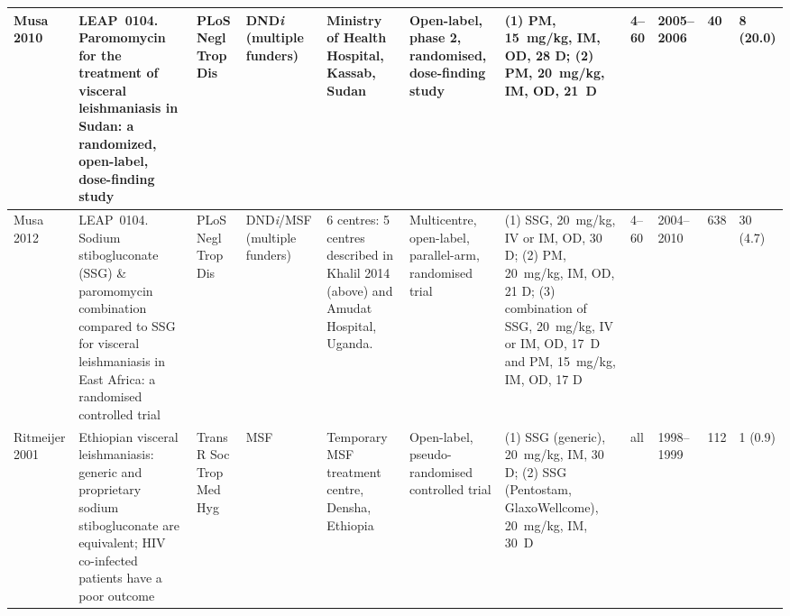 \begin{ThreePartTable}
\begin{longtable}[c]{L{1cm} L{4cm} L{1cm} L{1.5cm} L{3.5cm} L{2.5cm} L{3.7cm} L{1cm} L{1cm} L{1cm} L{1.3cm}}
    Musa 2010\cite{musa2010}           & LEAP~0104. Paromomycin for the treatment of visceral leishmaniasis in Sudan: a randomized, open-label, dose-finding study                                                                             & PLoS Negl Trop Dis       & DND\textit{i} (multiple funders)     & Ministry of Health Hospital, Kassab, Sudan                                                                                                                                         & Open-label, phase 2, randomised, dose-finding study                                & (1) PM, 15~mg/kg, IM, OD, 28 D; (2) PM, 20~mg/kg, IM, OD, 21~D                                                                                                                                                              & 4--60       & 2005--2006   & 40        & 8 (20.0)      \\ \midrule
    Musa 2012\cite{musa2012}           & LEAP~0104. Sodium stibogluconate (SSG) \& paromomycin combination compared to SSG for visceral leishmaniasis in East Africa: a randomised controlled trial                                            & PLoS Negl Trop Dis       & DND\textit{i}/MSF (multiple funders) & 6 centres: 5 centres described in Khalil 2014 (above) and Amudat Hospital, Uganda.                                                                                                 & Multicentre, open-label, parallel-arm, randomised trial                            & (1) SSG, 20~mg/kg, IV or IM, OD, 30 D; (2) PM, 20~mg/kg, IM, OD, 21 D; (3) combination of SSG, 20~mg/kg, IV or IM, OD, 17~D and PM, 15~mg/kg, IM, OD, 17 D                                                                  & 4--60       & 2004--2010   & 638       & 30 (4.7)      \\ \midrule
    Ritmeijer 2001\cite{ritmeijer2001} & Ethiopian visceral leishmaniasis: generic and proprietary sodium stibogluconate are equivalent; HIV co-infected patients have a poor outcome                                                          & Trans R Soc Trop Med Hyg & MSF                                  & Temporary MSF treatment centre, Densha, Ethiopia                                                                                                                                   & Open-label, pseudo-randomised controlled trial                                     & (1) SSG (generic), 20~mg/kg, IM, 30 D; (2) SSG (Pentostam, GlaxoWellcome), 20~mg/kg, IM, 30~D                                                                                                                      & all         & 1998--1999   & 112       & 1 (0.9)       \\ \midrule

\end{longtable}
\end{ThreePartTable}
